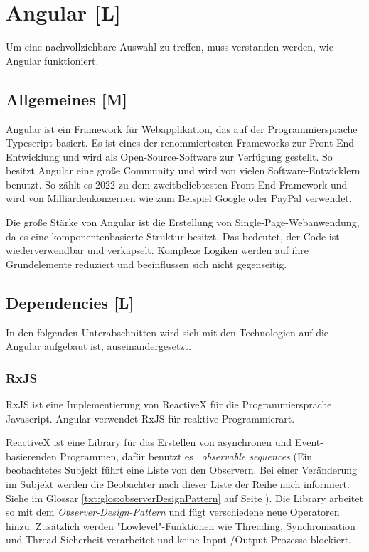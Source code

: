 \section{Angular [L]}
Um eine nachvollziehbare Auswahl zu treffen, muss verstanden werden, wie Angular funktioniert. 

\subsection{Allgemeines [M]}
Angular ist ein Framework für Webapplikation, das auf der Programmiersprache Typescript basiert. Es ist eines der renommiertesten Frameworks zur Front-End-Entwicklung und wird als Open-Source-Software zur Verfügung gestellt. So besitzt Angular eine große Community und wird von vielen Software-Entwicklern benutzt. So zählt es 2022 zu dem zweitbeliebtesten Front-End Framework \cite{AngularEvidence} und wird von Milliardenkonzernen wie zum Beispiel Google oder PayPal verwendet. 
\cite{AngularEvidence2}

Die große Stärke von Angular ist die Erstellung von Single-Page-Webanwendung, da es eine komponentenbasierte Struktur besitzt. Das bedeutet, der Code ist wiederverwendbar und verkapselt. Komplexe Logiken werden auf ihre Grundelemente reduziert und beeinflussen sich nicht gegenseitig.
\cite{AngularGeneral}

\subsection{Dependencies [L]}
In den folgenden Unterabschnitten wird sich mit den Technologien auf die Angular aufgebaut ist, auseinandergesetzt. 
\subsubsection{RxJS}
RxJS ist eine Implementierung von ReactiveX für die Programmiersprache Javascript. Angular verwendet RxJS für reaktive Programmierart.

ReactiveX ist eine Library für das Erstellen von asynchronen und Event-basierenden Programmen, dafür benutzt es  \emph{observable sequences} (Ein beobachtetes Subjekt führt eine Liste von den Observern. Bei einer Veränderung im Subjekt werden die Beobachter nach dieser Liste der Reihe nach informiert. Siehe im Glossar \ref{txt:glos:observerDesignPattern} auf Seite \pageref{txt:glos:observerDesignPattern}).
Die Library arbeitet so mit dem \emph{Observer-Design-Pattern} und fügt verschiedene neue Operatoren hinzu. Zusätzlich werden "Lowlevel"-Funktionen wie Threading, Synchronisation und Thread-Sicherheit verarbeitet und keine Input-/Output-Prozesse blockiert.

